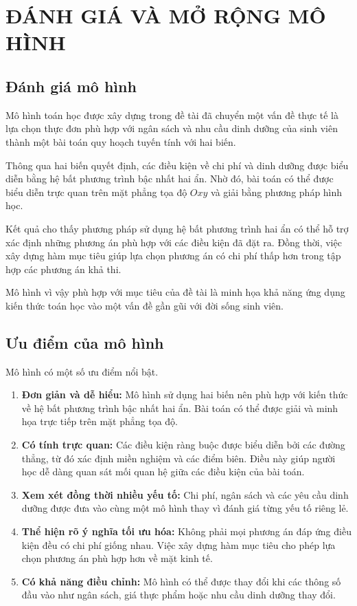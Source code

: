 \documentclass[12pt,a4paper]{article}
\begin{document}
\newpage

\section{ĐÁNH GIÁ VÀ MỞ RỘNG MÔ HÌNH}

\subsection{Đánh giá mô hình}

Mô hình toán học được xây dựng trong đề tài đã chuyển một vấn đề
thực tế là lựa chọn thực đơn phù hợp với ngân sách và nhu cầu dinh
dưỡng của sinh viên thành một bài toán quy hoạch tuyến tính với hai
biến.

Thông qua hai biến quyết định, các điều kiện về chi phí và dinh dưỡng
được biểu diễn bằng hệ bất phương trình bậc nhất hai ẩn. Nhờ đó, bài
toán có thể được biểu diễn trực quan trên mặt phẳng tọa độ $Oxy$ và
giải bằng phương pháp hình học.

Kết quả cho thấy phương pháp sử dụng hệ bất phương trình hai ẩn có
thể hỗ trợ xác định những phương án phù hợp với các điều kiện đã đặt
ra. Đồng thời, việc xây dựng hàm mục tiêu giúp lựa chọn phương án có
chi phí thấp hơn trong tập hợp các phương án khả thi.

Mô hình vì vậy phù hợp với mục tiêu của đề tài là minh họa khả năng
ứng dụng kiến thức toán học vào một vấn đề gần gũi với đời sống sinh
viên.

\subsection{Ưu điểm của mô hình}

Mô hình có một số ưu điểm nổi bật.
\begin{enumerate}
    \item \textbf{Đơn giản và dễ hiểu:} Mô hình sử dụng hai biến nên
    phù hợp với kiến thức về hệ bất phương trình bậc nhất hai ẩn.
    Bài toán có thể được giải và minh họa trực tiếp trên mặt phẳng
    tọa độ.
    \item \textbf{Có tính trực quan:} Các điều kiện ràng buộc được
    biểu diễn bởi các đường thẳng, từ đó xác định miền nghiệm và các
    điểm biên. Điều này giúp người học dễ dàng quan sát mối quan hệ
    giữa các điều kiện của bài toán.
    \item \textbf{Xem xét đồng thời nhiều yếu tố:} Chi phí, ngân sách
    và các yêu cầu dinh dưỡng được đưa vào cùng một mô hình thay vì
    đánh giá từng yếu tố riêng lẻ.
    \item \textbf{Thể hiện rõ ý nghĩa tối ưu hóa:} Không phải mọi
    phương án đáp ứng điều kiện đều có chi phí giống nhau. Việc xây
    dựng hàm mục tiêu cho phép lựa chọn phương án phù hợp hơn về mặt
    kinh tế.
    \item \textbf{Có khả năng điều chỉnh:} Mô hình có thể được thay
    đổi khi các thông số đầu vào như ngân sách, giá thực phẩm hoặc
    nhu cầu dinh dưỡng thay đổi.
\end{enumerate}
\end{document}
